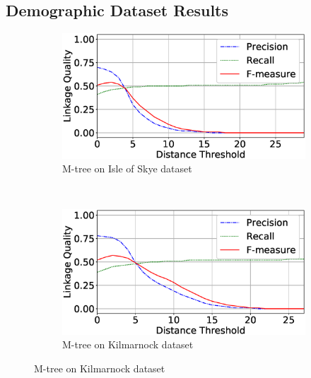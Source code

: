 \documentclass{llncs}
\begin{document}

\subsection{Demographic Dataset Results}

\begin{figure}[t]
\centering
\begin{subfigure}{.47\textwidth}
  \centering
\includegraphics[width=\textwidth]{figures/plotLQ-skye-mtree}
\vspace{-6mm}
\caption{M-tree on Isle of Skye dataset\label{skye-quality-mtree}}
\end{subfigure}%
~~
\begin{subfigure}{.47\textwidth}
  \centering
\includegraphics[width=\textwidth]{figures/plotLQ-kilmarnock-mtree}
\vspace{-6mm}
\caption{M-tree on Kilmarnock dataset \label{kilmarnock-quality-mtree}}
\end{subfigure} \vspace{5mm}


\end{figure}
\end{document}
